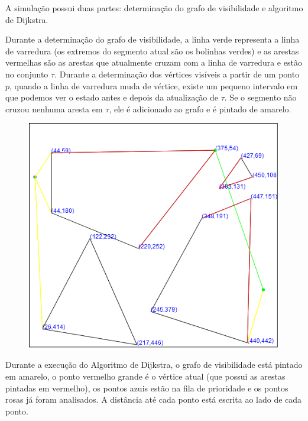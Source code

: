 \documentclass[11pt]{article} %
\begin{document}
A simulação possui duas partes: determinação do grafo de visibilidade e algoritmo de Dijkstra.

Durante a determinação do grafo de visibilidade, a linha verde representa a linha de varredura (os extremos do segmento atual são os bolinhas verdes) e as arestas vermelhas são as arestas que atualmente cruzam com a linha de varredura e estão no conjunto $\tau$. Durante a determinação dos vértices visíveis a partir de um ponto $p$, quando a linha de varredura muda de vértice, existe um pequeno intervalo em que podemos ver o estado antes e depois da atualização de $\tau$. Se o segmento não cruzou nenhuma aresta em $\tau$, ele é adicionado ao grafo e é pintado de amarelo.

\begin{figure}[!htp]
	\begin{center}
		\includegraphics[scale=0.5]{img/visgraph.png}
	\end{center}	
\end{figure}
\newpage
Durante a execução do Algoritmo de Dijkstra, o grafo de visibilidade está pintado em amarelo, o ponto vermelho grande é o vértice atual (que possui as arestas pintadas em vermelho), os pontos azuis estão na fila de prioridade e os pontos rosas já foram analisados. A distância até cada ponto está escrita ao lado de cada ponto.
\end{document}
